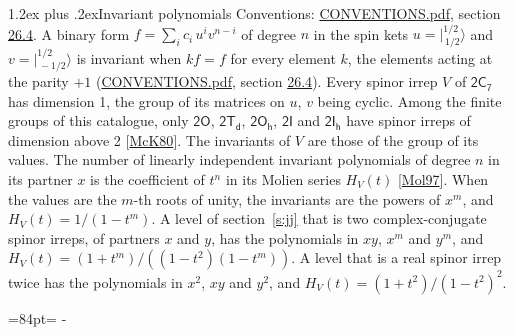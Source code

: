 \documentclass[10pt,a4paper]{article}
\makeatletter
\renewcommand\section{\@startsection{section}{1}{\z@}{-3ex plus -1ex minus -.2ex}%
  {1.2ex plus .2ex}{\normalfont\large\sffamily\bfseries\color{parttitle}}}
\newcommand{\needspace}[1]{\par\penalty-100\begingroup\dimen0=#1\relax\dimen2=\pagegoal
  \advance\dimen2-\pagetotal\ifdim\dimen0>\dimen2\relax\ifdim\dimen2>0pt\vfil\break\fi\fi
  \endgroup}
\numberwithin{equation}{section}
\newcommand{\grp}[1]{\mathsf{#1}}
\newcommand{\jm}[2]{\bigl\lvert{}^{#1}_{\,#2}\bigr\rangle}
\makeatother
\begin{document}
\section{Invariant polynomials}\label{s:invariants}
Conventions: \href{../../CONVENTIONS.pdf}{CONVENTIONS.pdf}, section \href{../../CONVENTIONS.pdf\#conv.26.4}{26.4}.
\leavevmode\label{n:local.binary.form}A binary form $f = \sum_i c_i\, u^i v^{n-i}$ of degree $n$ in the spin kets $u = \jm{1/2}{1/2}$ and $v = \jm{1/2}{-1/2}$ is invariant when $k f = f$ for every element $k$, the elements acting at the parity $+1$ (\href{../../CONVENTIONS.pdf}{CONVENTIONS.pdf}, section \href{../../CONVENTIONS.pdf\#conv.26.4}{26.4}).
\leavevmode\label{n:function.hilbert}Every spinor irrep $V$ of $\grp{2C_{7}}$ has dimension 1, the group of its matrices on $u$, $v$ being cyclic. Among the finite groups of this catalogue, only $\grp{2O}$, $\grp{2T_{d}}$, $\grp{2O_{h}}$, $\grp{2I}$ and $\grp{2I_{h}}$ have spinor irreps of dimension above 2 [\href{../../../REFERENCES.pdf\#ref.McK80}{McK80}]. The invariants of $V$ are those of the group of its values. \label{n:local.partner.x}The number of linearly independent invariant polynomials of degree $n$ in its partner $x$ is the coefficient of $t^n$ in its Molien series $H_V(t)$ [\href{../../../REFERENCES.pdf\#ref.Mol97}{Mol97}]. When the values are the $m$-th roots of unity, the invariants are the powers of $x^{m}$, and $H_V(t) = 1/(1 - t^{m})$. A level of section~\ref{s:jj} that is two complex-conjugate spinor irreps, of partners $x$ and $y$, has the polynomials in $xy$, $x^{m}$ and $y^{m}$, and $H_V(t) = (1 + t^{m})/((1 - t^{2})(1 - t^{m}))$. A level that is a real spinor irrep twice has the polynomials in $x^{2}$, $xy$ and $y^{2}$, and $H_V(t) = (1 + t^{2})/(1 - t^{2})^{2}$.
\needspace{84pt}
\end{document}
